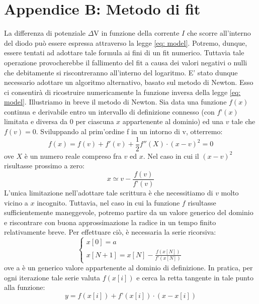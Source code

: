 \documentclass{article}[a4paper, oneside, 11pt]
\begin{document}
\section{Appendice B: Metodo di fit}\label{app: B}
La differenza di potenziale $\Delta$V in funzione della corrente $I$ che scorre 
all’interno del diodo può essere espressa attraverso la legge
\eqref{eq: model}. Potremo, dunque, essere tentati ad adottare tale formula
ai fini di un fit numerico. 
Tuttavia tale operazione provocherebbe il fallimento del fit a causa dei valori 
negativi o nulli che debitamente si riscontreranno all’interno del logaritmo. 
E’ stato dunque necessario adottare un algoritmo alternativo, basato sul 
metodo di Newton\cite{tesi}. Esso ci consentirà di ricostruire numericamente 
la funzione inversa della legge \eqref{eq: model}.
Illustriamo in breve il metodo di Newton. Sia data una funzione $f(x)$ continua e 
derivabile entro un intervallo di definizione connesso (con $f’(x)$ limitata e 
diversa da $0$ per ciascuna $x$ appartenente al dominio) ed una $v$ tale che
$f(v) = 0$. Sviluppando al prim’ordine f in un intorno di v, otterremo:
\begin{equation}
f(x) = f(v) + f{'}(v) + {\frac{1}{2}} {f{''}(X)} \cdot  {( x - v)^2} = 0
\end{equation}
ove $X$ è un numero reale compreso fra $v$ ed $x$. Nel caso in cui il $(x-v)^2 
$risultasse prossimo a zero:
\begin{equation}
x \simeq v   -  {\frac {f(v)}{f’(v)}}
\end{equation}
L’unica limitazione nell’adottare tale scrittura è che necessitiamo di $v$ 
molto vicino a $x$ incognito. Tuttavia, nel caso in cui la funzione $f$ risultasse 
sufficientemente maneggevole, potremo partire da un valore generico del dominio 
e riscontrare con buona approssimazione la radice in un tempo finito 
relativamente breve. Per effettuare ciò, è necessaria la serie ricorsiva:
\begin{equation}
\begin{cases}
x[0] = a \\ x[N+1] = x[N] - \frac {f(x[N])} {f’(x[N])}
\end{cases}
\end{equation}
ove a è un generico valore appartenente al dominio di definizione. In pratica, 
per ogni iterazione tale serie valuta $f(x[i])$ e cerca la retta tangente in tale 
punto alla funzione:
\begin{equation}
y = f(x[i]) + f’(x[i]) \cdot (x-x[i])
\end{equation}
\end{document}

